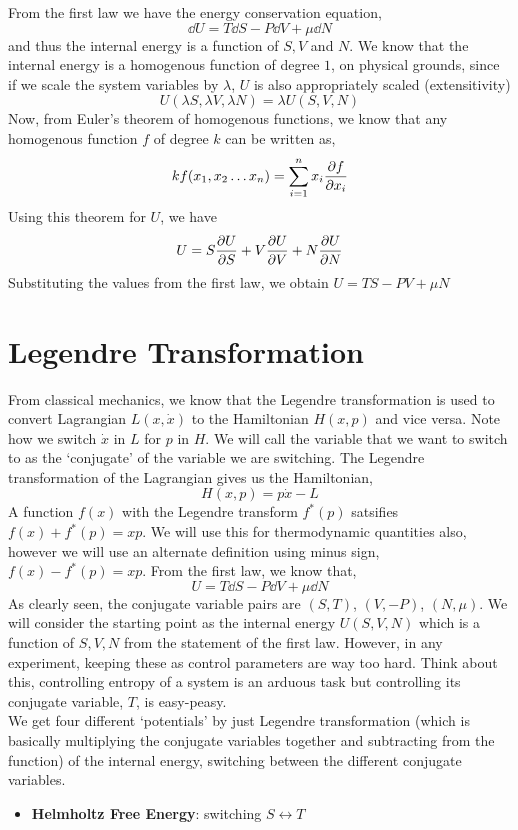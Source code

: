 \begin{appendices}
    From the first law we have the energy conservation equation,
$$\dd U = T\dd S - P\dd V + \mu \dd N$$
and thus the internal energy is a function of $S,V$ and $N$. We know that the internal energy is a homogenous function of degree $1$, on physical grounds, since if we scale the system variables by $\lambda$, $U$ is also appropriately scaled (extensitivity)
$$U(\lambda S,\lambda V,\lambda N) = \lambda U(S,V,N)$$
Now, from Euler's theorem of homogenous functions, we know that any homogenous function $f$ of degree $k$ can be written as,
$$kf(x_1,x_2\ldots x_n) = \sum\limits_{i=1}^n x_i \pdv{f}{x_i}$$
Using this theorem for $U$, we have 
$$U = S \pdv{U}{S}+V \pdv{U}{V}+N \pdv{U}{N}$$
Substituting the values from the first law, we obtain $U = TS -PV+\mu N$
\section{Legendre Transformation}
\label{appendix:legendre}
From classical mechanics, we know that the Legendre transformation is used to convert Lagrangian $L(x,\dot{x})$ to the Hamiltonian $H(x,p)$ and vice versa. Note how we switch $\dot{x}$ in $L$ for $p$ in $H$. We will call the variable that we want to switch to as the `conjugate' of the variable we are switching. The Legendre transformation of the Lagrangian gives us the Hamiltonian, 
$$H(x,p) = p\dot{x}-L$$
A function $f(x)$ with the Legendre transform $f^*(p)$ satsifies $f(x)+f^*(p) = xp$. We will use this for thermodynamic quantities also, however we will use an alternate definition using minus sign, $f(x)-f^*(p) = xp$. From the first law, we know that,
$$U = T\dd S-P\dd V + \mu \dd N$$
As clearly seen, the conjugate variable pairs are $(S,T)$, $(V,-P)$, $(N,\mu)$. We will consider the starting point as the internal energy $U(S,V,N)$ which is a function of $S,V,N$ from the statement of the first law. However, in any experiment, keeping these as control parameters are way too hard. Think about this, controlling entropy of a system is an arduous task but controlling its conjugate variable, $T$, is easy-peasy.\\[0.2cm]
We get four different `potentials' by just Legendre transformation (which is basically multiplying the conjugate variables together and subtracting from the function) of the internal energy, switching between the different conjugate variables. 
\begin{itemize}
    \item \textbf{Helmholtz Free Energy}: switching $S\leftrightarrow T$

\end{itemize}
\end{appendices}
